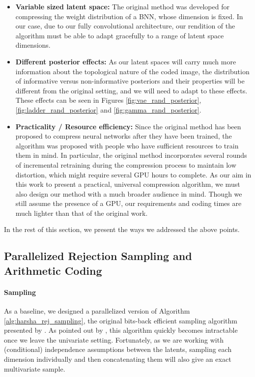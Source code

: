 \begin{itemize}
\item \textbf{Variable sized latent space:} The original method was
  developed for compressing the weight distribution of a BNN, whose dimension is
  fixed. In our case, due to our fully convolutional architecture, our rendition
  of the algorithm must be able to adapt gracefully to a range of latent space
  dimensions. 

\item \textbf{Different posterior effects:} As our latent spaces will carry much
  more information about the topological nature of the coded image, the
  distribution of informative versus non-informative posteriors and their
  properties will be different from the original setting, and we will need to
  adapt to these effects. These effects can be seen in Figures
  \ref{fig:vae_rand_posterior}, \ref{fig:ladder_rand_posterior} and
  \ref{fig:gamma_rand_posterior}.

\item \textbf{Practicality / Resource efficiency:} Since the original method has
  been proposed to compress neural networks after they have been trained, the
  algorithm was proposed with people who have sufficient resources to train them
  in mind. In particular, the original method incorporates several rounds of
  incremental retraining during the compression process to maintain low distortion, which
  might require several GPU hours to complete. As our aim in this work to
  present a practical, universal compression algorithm, we must also design our
  method with a much broader audience in mind. Though we still assume the
  presence of a GPU, our requirements and coding times are much lighter than
  that of the original work.
\end{itemize}

In the rest of this section, we present the ways we addressed the above points.

\subsection{Parallelized Rejection Sampling and Arithmetic Coding}

\paragraph{Sampling}
As a baseline, we designed a parallelized version of Algorithm
\ref{alg:harsha_rej_sampling}, the original bits-back efficient sampling
algorithm presented by \cite{harsha2007communication}. As pointed out by
\cite{havasi2018minimal}, this algorithm quickly becomes intractable once
we leave the univariate setting. Fortunately, as we are working with
(conditional) independence assumptions between the latents, 
sampling each dimension individually and then concatenating them will also
give an exact multivariate sample.

